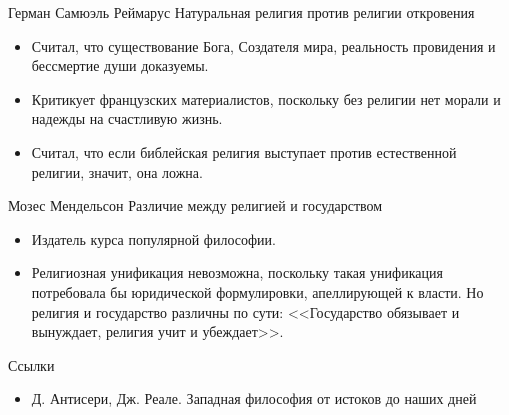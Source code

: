 \documentclass{beamer}
\begin{document}
    \begin{frame}{Герман Самюэль Реймарус}
            {Натуральная религия против религии откровения}
        \begin{itemize}
        \item Считал, что существование Бога, Создателя мира,
            реальность провидения и бессмертие души доказуемы.
        \item Критикует французских материалистов, поскольку без религии
            нет морали и надежды на счастливую жизнь.
        \item Считал, что если библейская религия выступает против
            естественной религии, значит, она ложна.
        \end{itemize}
    \end{frame}

    \begin{frame}{Мозес Мендельсон}
            {Различие между религией и государством}
        \begin{itemize}
        \item Издатель курса популярной философии.
        \item Религиозная унификация невозможна, поскольку такая унификация
            потребовала бы юридической формулировки, апеллирующей к власти.
            Но религия и государство различны по сути:
            <<Государство обязывает и вынуждает, религия учит и убеждает>>.
        \end{itemize}
    \end{frame}

    \begin{frame}{Ссылки}
        \begin{itemize}
        \item Д. Антисери, Дж. Реале.
            Западная философия от истоков до наших дней
        \end{itemize}
    \end{frame}
\end{document}
